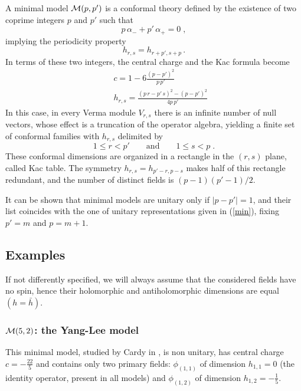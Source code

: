 \documentclass[a4paper,12pt]{report}
\begin{document}
\vspace{0.5cm}

A minimal model ${\cal M}(p,p')$ is a conformal theory defined by the existence of two coprime integers $p$ and
$p'$ such that
\begin{equation}
p\,\alpha_{-}+p'\,\alpha_{+}=0 \; ,
\end{equation}
implying the periodicity property
\begin{equation}
h_{r,s}=h_{r+p',s+p}\,.
\end{equation}
In terms of these two integers, the central charge and the Kac formula become
\begin{eqnarray}
&& c=1-6\frac{(p-p')^{2}}{p\, p'}\\
&& h_{r,s}=\frac{(p\, r-p'\,s)^{2}-(p-p')^{2}}{4 p \,p'}
\end{eqnarray}
In this case, in every Verma module $V_{r,s}$ there is an infinite number of null vectors, whose effect is a
truncation of the operator algebra, yielding a finite set of conformal families with $h_{r,s}$ delimited by
\begin{equation}
1\leq r< p'\qquad\textrm{and}\qquad 1\leq s< p \; .
\end{equation}
These conformal dimensions are organized in a rectangle in the $(r,s)$ plane, called Kac table. The symmetry
$h_{r,s}=h_{p'-r,p-s}$ makes half of this rectangle redundant, and the number of distinct fields is
$(p-1)(p'-1)/2$.

It can be shown that minimal models are unitary only if $|p-p'|=1$, and their list coincides with the one of
unitary representations given in (\ref{min}), fixing $p'=m$ and $p=m+1$.

\newpage

\subsection{Examples}

If not differently specified, we will always assume that the considered fields have no spin, hence their
holomorphic and antiholomorphic dimensions are equal $(h=\bar{h})$.

\subsubsection{${\cal M}(5,2)$: the Yang-Lee model}

This minimal model, studied by Cardy in \cite{M52}, is non unitary, has central charge $c=-\frac{22}{5}$ and
contains only two primary fields: $\phi_{(1,1)}$ of dimension $h_{1,1}=0$ (the identity operator, present in all
models) and $\phi_{(1,2)}$ of dimension $h_{1,2}=-\frac{1}{5}$.
\end{document}
